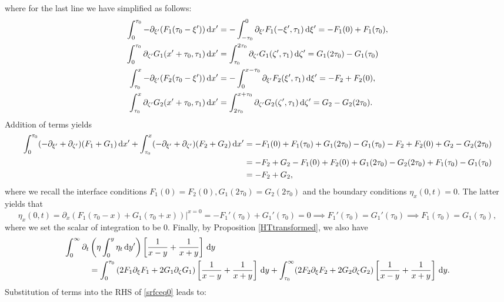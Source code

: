 \documentclass[10pt,reqno,oneside,a4paper, landscape]{article}
\begin{document}
where for the last line we have simplified as follows:
\begin{align*}
\int^{\tau_0}_{0} -\partial_{\xi'}(F_1(\tau_0 - \xi')) \,\mathrm{d} x' &=  -\int^{0}_{-\tau_0}\partial_{\xi'} F_1(-\xi', \tau_1) \,\mathrm{d} \xi' = -F_1(0) + F_1(\tau_0), \\
\int^{\tau_0}_{0} \partial_{\zeta'} G_1(x'+\tau_0, \tau_1) \,\mathrm{d} x' &=  \int^{2\tau_0}_{\tau_0}\partial_{\zeta'} G_1(\zeta', \tau_1) \,\mathrm{d} \zeta'  = G_1(2\tau_0) - G_1(\tau_0) \\
\int_{\tau_0}^{x} -\partial_{\xi'}(F_2(\tau_0 - \xi')) \,\mathrm{d} x' &=  -\int_{0}^{x-\tau_0}\partial_{\xi'} F_2(\xi', \tau_1) \,\mathrm{d} \xi' = -F_2 + F_2(0), \\
\int_{\tau_0}^{x} \partial_{\zeta'} G_2(x'+\tau_0, \tau_1) \,\mathrm{d} x' &=  \int_{2\tau_0}^{x+\tau_0}\partial_{\zeta'} G_2(\zeta', \tau_1) \,\mathrm{d} \zeta'  = G_2 - G_2(2\tau_0).
\end{align*}
Addition of terms yields
\begin{align*}
\int^{\tau_0}_{0} (-\partial_{\xi'} + \partial_{\zeta'}) (F_1+G_1) \,\mathrm{d} x' + \int_{\tau_0}^{x} (-\partial_{\xi'} + \partial_{\zeta'}) (F_2+G_2) \,\mathrm{d} x' &=  -F_1(0) + F_1(\tau_0) + G_1(2\tau_0) - G_1(\tau_0) -F_2 + F_2(0) + G_2 - G_2(2\tau_0) \\
&= -F_2  + G_2 -F_1(0) + F_2(0) + G_1(2\tau_0)- G_2(2\tau_0) + F_1(\tau_0)- G_1(\tau_0) \\
&=  -F_2  + G_2,
\end{align*}
where we recall the interface conditions $F_1(0) = F_2(0), G_1(2\tau_0) =G_2(2\tau_0)$ and the boundary conditions $\eta_x(0,t) = 0.$ The latter yields that
\[ \eta_x(0,t) = \partial_x(F_1(\tau_0-x) + G_1(\tau_0+x))\bigg|^{x=0} =  -F_1'(\tau_0) + G_1'(\tau_0) = 0 \implies  F_1'(\tau_0) = G_1'(\tau_0)  \implies F_1(\tau_0) = G_1(\tau_0), \]
where we set the scalar of integration to be 0. Finally, by Proposition \ref{HTtransformed}, we also have 
\begin{align*}
\int_0^\infty \partial_t &\left( \eta \int^{y}_0\eta_{t} \,\mathrm{d} y' \right) \left[ \frac{1}{x-y} + \frac{1}{x+y} \right] \,\mathrm{d} y \\
&=  \int_0^{\tau_0} \left( 2 F_1  \partial_\xi F_1 + 2 G_1 \partial_\zeta G_1 \right) \left[ \frac{1}{x-y} + \frac{1}{x+y} \right] \,\mathrm{d} y +\int_{\tau_0}^\infty (2 F_2 \partial_\xi F_2 + 2 G_2 \partial_\zeta G_2 )\left[ \frac{1}{x-y} + \frac{1}{x+y} \right] \,\mathrm{d} y.
\end{align*}
Substitution of terms into the RHS of \eqref{srfceq0} leads to:
\end{document}
